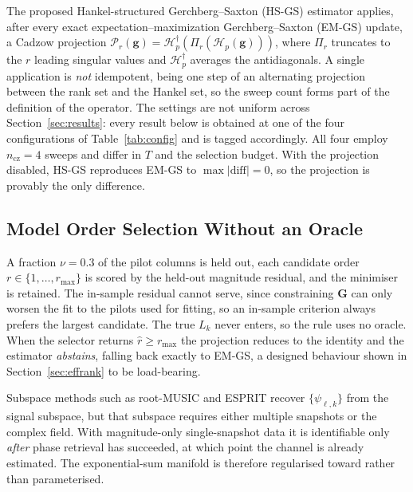 \documentclass[journal]{IEEEtran}
\newcommand{\bG}{\mathbf{G}}
\newcommand{\bg}{\mathbf{g}}
\newcommand{\Hank}{\mathcal{H}}
\newcommand{\rmax}{r_{\max}}
\begin{document}
The proposed Hankel-structured Gerchberg--Saxton (HS-GS) estimator applies,
after every exact expectation--maximization Gerchberg--Saxton (EM-GS) update, a
Cadzow projection $\mathcal{P}_r(\bg)=\Hank_p^{\dagger}(\Pi_r(\Hank_p(\bg)))$,
where $\Pi_r$ truncates to the $r$ leading singular values and
$\Hank_p^{\dagger}$ averages the antidiagonals. A single application is
\emph{not} idempotent, being one step of an alternating projection between the
rank set and the Hankel set, so the sweep count forms part of the definition of
the operator. The settings are not uniform across Section~\ref{sec:results}:
every result below is obtained at one of the four configurations of
Table~\ref{tab:config} and is tagged accordingly. All four employ
$n_{\mathrm{cz}}=4$ sweeps and differ in $T$ and the selection budget. With the
projection disabled, HS-GS reproduces EM-GS to $\max|\text{diff}|=0$, so the
projection is provably the only difference.

\subsection{Model Order Selection Without an Oracle}

A fraction $\nu=0.3$ of the pilot columns is held out, each candidate order
$r\in\{1,\dots,\rmax\}$ is scored by the held-out magnitude residual, and the
minimiser is retained. The in-sample residual cannot serve, since constraining
$\bG$ can only worsen the fit to the pilots used for fitting, so an in-sample
criterion always prefers the largest candidate. The true $L_k$ never enters, so
the rule uses no oracle. When the selector returns $\hat r\ge\rmax$ the
projection reduces to the identity and the estimator \emph{abstains}, falling
back exactly to EM-GS, a designed behaviour shown in Section~\ref{sec:effrank}
to be load-bearing.

Subspace methods such as root-MUSIC and ESPRIT recover $\{\psi_{\ell,k}\}$ from
the signal subspace, but that subspace requires either multiple snapshots or the
complex field. With magnitude-only single-snapshot data it is identifiable only
\emph{after} phase retrieval has succeeded, at which point the channel is already
estimated. The exponential-sum manifold is therefore regularised toward rather
than parameterised.
\end{document}
